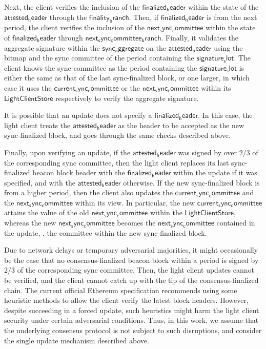 Next, the client verifies the inclusion of the $\mathsf{finalized_header}$ within the state 
of the $\mathsf{attested_header}$ through the $\mathsf{finality_branch}$.
Then, if $\mathsf{finalized_header}$ is from the next period, the client verifies the inclusion of the
$\mathsf{next_sync_committee}$ within the state of $\mathsf{finalized_header}$ through $\mathsf{next_sync_committee_branch}$.
Finally, it validates the aggregate signature within the $\mathsf{sync_aggregate}$ on the $\mathsf{attested_header}$ 
using the bitmap and the sync committee of the period containing the $\mathsf{signature_slot}$.
The client knows the sync committee as the period containing the $\mathsf{signature_slot}$ is either the same as 
that of the last sync-finalized block, or one larger, in which case it uses the $\mathsf{current_sync_committee}$ or 
the $\mathsf{next_sync_committee}$ within its $\mathsf{LightClientStore}$ respectively to verify the aggregate signature.

It is possible that an update does not specify a $\mathsf{finalized_header}$. 
In this case, the light client treats the $\mathsf{attested_header}$ as the header to be accepted 
as the new sync-finalized block, and goes through the same checks described above.

Finally, upon verifying an update, if the $\mathsf{attested_header}$
was signed by over $2/3$ of the corresponding sync committee, then the light client replaces
its last sync-finalized beacon block header with the $\mathsf{finalized_header}$ within the update if it
was specified, and with the $\mathsf{attested_header}$ otherwise.
If the new sync-finalized block is from a higher period, then the client also updates 
the $\mathsf{current_sync_committee}$ and the $\mathsf{next_sync_committee}$ within its view.
In particular, the new $\mathsf{current_sync_committee}$ attains the value of the old $\mathsf{next_sync_committee}$ 
within the $\mathsf{LightClientStore}$, whereas the new $\mathsf{next_sync_committee}$ becomes 
the $\mathsf{next_sync_committee}$ contained in the update, \ie, the committee within the new sync-finalized block.

Due to network delays or temporary adversarial majorities, it might occasionally be the case that
no consensus-finalized beacon block within a period is signed by $2/3$ of the corresponding sync committee. 
Then, the light client updates cannot be verified, and the client cannot catch up with the tip of the consensus-finalized chain.
The current official Ethereum specification recommends using some heuristic methods to allow the client verify
the latest block headers.
However, despite succeeding in a forced update, such heuristics might harm the light client security
under certain adversarial conditions.
Thus, in this work, we assume that the underlying consensus protocol is not subject to such disruptions, 
and consider the single update mechanism described above.

